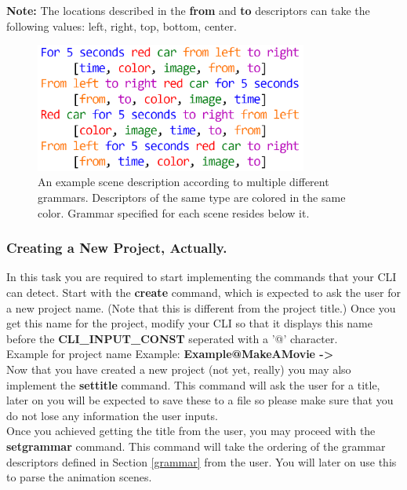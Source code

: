 \documentclass[a4paper]{article}
\begin{document}
	\noindent \textbf{Note:} The locations described in the \textbf{from} and \textbf{to} descriptors can take the following values: left, right, top, bottom, center.
	
	\begin{figure}[!htb]
		\centering
		\includegraphics[width=0.8\textwidth]{../img/example_grammar.png}
		\caption{An example scene description according to multiple different grammars. Descriptors of the same type are colored in the same color. Grammar specified for each scene resides below it.}
	\end{figure}
	
	\subsubsection{Creating a New Project, Actually.}
	
	In this task you are required to start implementing the commands that your CLI can detect. Start with the \textbf{create} command, which is expected to ask the user for a new project name. (Note that this is different from the project title.) Once you get this name for the project, modify your CLI so that it displays this name before the \textbf{CLI\_INPUT\_CONST} seperated with a '@' character. \\
	
	Example for project name Example: \textbf{Example@MakeAMovie -\textgreater}\\
	
	Now that you have created a new project (not yet, really) you may also implement the \textbf{settitle} command. This command will ask the user for a title, later on you will be expected to save these to a file so please make sure that you do not lose any information the user inputs.\\
	
	Once you achieved getting the title from the user, you may proceed with the \textbf{setgrammar} command. This command will take the ordering of the grammar descriptors defined in Section \ref{grammar} from the user. You will later on use this to parse the animation scenes.\\
	
\end{document}
